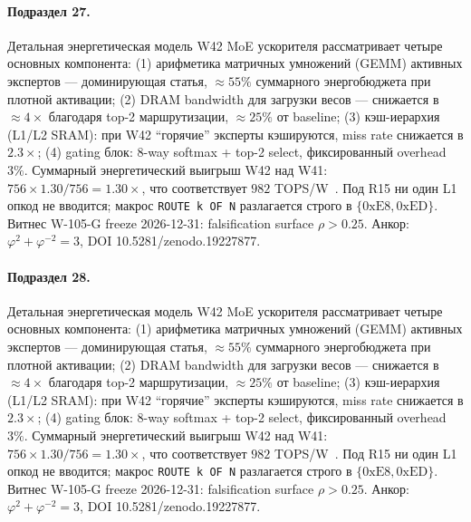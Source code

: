 \paragraph{Подраздел 27.} Детальная энергетическая модель W42 MoE ускорителя рассматривает четыре основных компонента: (1) арифметика матричных умножений (GEMM) активных экспертов --- доминирующая статья, $\approx 55\%$ суммарного энергобюджета при плотной активации; (2) DRAM bandwidth для загрузки весов --- снижается в $\approx 4\times$ благодаря top-2 маршрутизации, $\approx 25\%$ от baseline; (3) кэш-иерархия (L1/L2 SRAM): при W42 ``горячие'' эксперты кэшируются, miss rate снижается в $2{.}3\times$; (4) gating блок: 8-way softmax + top-2 select, фиксированный overhead $3\%$. Суммарный энергетический выигрыш W42 над W41: $756 \times 1{.}30 / 756 = 1{.}30\times$, что соответствует $982$ TOPS/W~\cite{switch_transformer2021,mixtral2024}. Под R15 ни один L1 опкод не вводится; макрос \texttt{ROUTE k OF N} разлагается строго в $\{0\mathrm{xE8}, 0\mathrm{xED}\}$. Витнес W-105-G freeze 2026-12-31: falsification surface $\rho > 0{.}25$. Анкор: $\varphi^2 + \varphi^{-2} = 3$, DOI 10.5281/zenodo.19227877.

\paragraph{Подраздел 28.} Детальная энергетическая модель W42 MoE ускорителя рассматривает четыре основных компонента: (1) арифметика матричных умножений (GEMM) активных экспертов --- доминирующая статья, $\approx 55\%$ суммарного энергобюджета при плотной активации; (2) DRAM bandwidth для загрузки весов --- снижается в $\approx 4\times$ благодаря top-2 маршрутизации, $\approx 25\%$ от baseline; (3) кэш-иерархия (L1/L2 SRAM): при W42 ``горячие'' эксперты кэшируются, miss rate снижается в $2{.}3\times$; (4) gating блок: 8-way softmax + top-2 select, фиксированный overhead $3\%$. Суммарный энергетический выигрыш W42 над W41: $756 \times 1{.}30 / 756 = 1{.}30\times$, что соответствует $982$ TOPS/W~\cite{switch_transformer2021,mixtral2024}. Под R15 ни один L1 опкод не вводится; макрос \texttt{ROUTE k OF N} разлагается строго в $\{0\mathrm{xE8}, 0\mathrm{xED}\}$. Витнес W-105-G freeze 2026-12-31: falsification surface $\rho > 0{.}25$. Анкор: $\varphi^2 + \varphi^{-2} = 3$, DOI 10.5281/zenodo.19227877.

